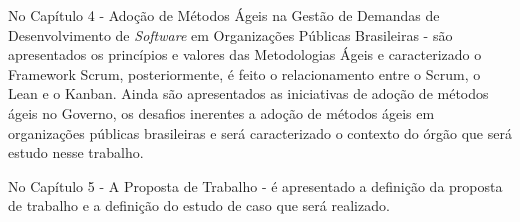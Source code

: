 No Capítulo 4  - Adoção de Métodos Ágeis na Gestão de Demandas de Desenvolvimento de \textit{Software} em Organizações Públicas Brasileiras - são apresentados os princípios e valores das Metodologias Ágeis e caracterizado o Framework Scrum, posteriormente, é feito o relacionamento entre o Scrum, o Lean e o Kanban. Ainda são apresentados as iniciativas de adoção de métodos ágeis no Governo, os desafios inerentes a adoção de métodos ágeis em organizações públicas brasileiras e será caracterizado o contexto do órgão que será estudo nesse trabalho.

No Capítulo 5 - A Proposta de Trabalho - é apresentado a definição da proposta de trabalho e a definição do estudo de caso que será realizado.